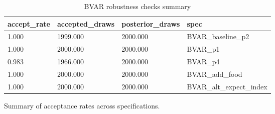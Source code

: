 \begin{table}[!htbp]
\centering
\small
\caption{BVAR robustness checks summary}
\label{tab:bvar_robustness}
\begin{threeparttable}
\begin{tabular}{@{}llll@{}}
\toprule
accept_rate & accepted_draws & posterior_draws & spec \\
\midrule
1.000 & 1999.000 & 2000.000 & BVAR_baseline_p2 \\
1.000 & 2000.000 & 2000.000 & BVAR_p1 \\
0.983 & 1966.000 & 2000.000 & BVAR_p4 \\
1.000 & 2000.000 & 2000.000 & BVAR_add_food \\
1.000 & 2000.000 & 2000.000 & BVAR_alt_expect_index \\
\bottomrule
\end{tabular}
\begin{tablenotes}[flushleft]
\footnotesize
\item Summary of acceptance rates across specifications.
\end{tablenotes}
\end{threeparttable}
\end{table}
